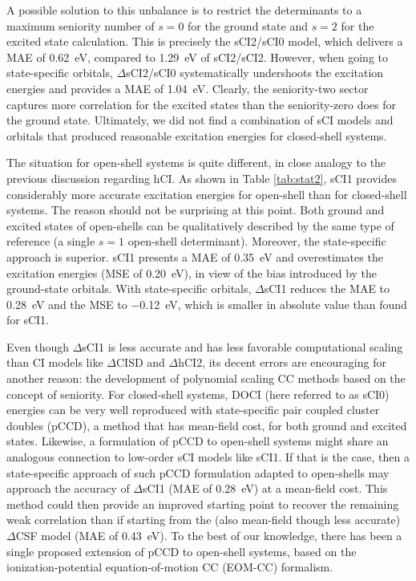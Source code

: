 \documentclass[aip,jcp,reprint,noshowkeys,superscriptaddress]{revtex4-1}
\begin{document}
A possible solution to this unbalance is to restrict the determinants to a maximum seniority number of $s=0$ for the ground state and $s=2$ for the excited state calculation.
This is precisely the sCI2/sCI0 model, which delivers a MAE of \SI{0.62}{\eV}, compared to \SI{1.29}{\eV} of sCI2/sCI2.
However, when going to state-specific orbitals, $\Delta$sCI2/sCI0 systematically undershoots the excitation energies and provides a MAE of \SI{1.04}{\eV}.
Clearly, the seniority-two sector captures more correlation for the excited states than the seniority-zero does for the ground state.
Ultimately, we did not find a combination of sCI models and orbitals that produced reasonable excitation energies for closed-shell systems.

The situation for open-shell systems is quite different, in close analogy to the previous discussion regarding hCI.
As shown in Table \ref{tab:stat2}, sCI1 provides considerably more accurate excitation energies for open-shell than for closed-shell systems.
The reason should not be surprising at this point.
Both ground and excited states of open-shells can be qualitatively described by the same type of reference (a single $s=1$ open-shell determinant).
Moreover, the state-specific approach is superior.
sCI1 presents a MAE of \SI{0.35}{\eV} and overestimates the excitation energies (MSE of \SI{+0.20}{\eV}), in view of the bias introduced by the ground-state orbitals.
With state-specific orbitals, $\Delta$sCI1 reduces the MAE to \SI{0.28}{\eV} and the MSE to \SI{-0.12}{\eV}, which is smaller in absolute value than found for sCI1.

Even though $\Delta$sCI1 is less accurate and has less favorable computational scaling than CI models like $\Delta$CISD and $\Delta$hCI2,
its decent errors are encouraging for another reason:
the development of polynomial scaling CC methods based on the concept of seniority.
For closed-shell systems, DOCI (here referred to as sCI0) energies can be very well reproduced with state-specific pair coupled cluster doubles (pCCD), a method that has mean-field cost,
for both ground \cite{Bytautas_2011,Allen_1962,Smith_1965,Veillard_1967} and excited \cite{Kossoski_2021,Marie_2021} states.
Likewise, a formulation of pCCD to open-shell systems might share an analogous connection to low-order sCI models like sCI1.
If that is the case, then a state-specific approach of such pCCD formulation adapted to open-shells may approach the accuracy of $\Delta$sCI1 (MAE of \SI{0.28}{\eV}) at a mean-field cost.
This method could then provide an improved starting point to recover the remaining weak correlation than if starting from the (also mean-field though less accurate) $\Delta$CSF model (MAE of \SI{0.43}{\eV}).
To the best of our knowledge, there has been a single proposed extension of pCCD to open-shell systems, \cite{Boguslawski_2021}
based on the ionization-potential equation-of-motion CC (EOM-CC) formalism. \cite{Stanton_1994,Muneaki_2006,Bomble_2005}
\end{document}
